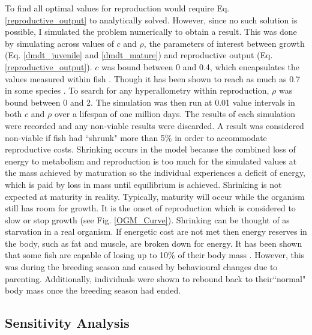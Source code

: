 \documentclass[a4paper, 11pt, hidelinks]{article} %
\begin{document}
	To find all optimal values for reproduction would require Eq. \ref{reproductive_output} to analytically solved.  However, since no such solution is possible, I simulated the problem numerically to obtain a result.  This was done by simulating across values of $ c $ and $ \rho $, the parameters of interest between growth (Eq. \ref{dmdt_juvenile} and \ref{dmdt_mature}) and reproductive output (Eq. \ref{reproductive_output}).  $ c $ was bound between 0 and 0.4, which encapsulates the values measured within fish \parencite{Benoit2018, Roff1983, Fontoura2009}.  Though it has been shown to reach as much as 0.7 in some species \parencite{Parker2018}.  To search for any hyperallometry within reproduction, $ \rho $ was bound between 0 and 2.  
	The simulation was then run at 0.01 value intervals in both $c$ and $\rho$ over a lifespan of one million days.  The results of each simulation were recorded and any non-viable results were discarded.  A result was considered non-viable if fish had ``shrunk" more than 5\% in order to accommodate reproductive costs.  Shrinking occurs in the model because  the combined loss of energy to metabolism and reproduction is too much for the simulated values at the mass achieved by maturation so the individual experiences a deficit of energy, which is paid by loss in mass until equilibrium is achieved. %
	Shrinking is not expected at maturity in reality.  Typically, maturity will occur while the organism still has room for growth.  It is the onset of reproduction which is considered to slow or stop growth %
	 (see Fig. \ref{OGM_Curve}).  Shrinking can be thought of as starvation in a real organism.  If energetic cost are not met then energy reserves in the body, such as fat and muscle, are broken down for energy.  It has been shown that some fish are capable of losing up to 10\% of their body mass \parencite{VandenBerghe1992}.  However, this was during the breeding season and caused by behavioural changes due to parenting.  Additionally, individuals were shown to rebound back to their``normal" body mass once the breeding season had ended.
	
	\subsection{Sensitivity Analysis}
\end{document}
